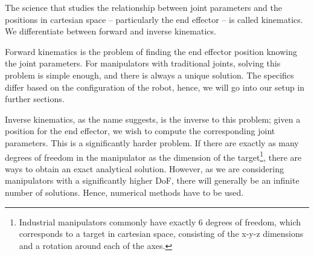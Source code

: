 The science that studies the relationship between joint parameters and the positions in cartesian space -- particularly the end effector -- is called kinematics.
We differentiate between forward and inverse kinematics.

Forward kinematics is the problem of finding the end effector position knowing the joint parameters. For manipulators with traditional joints, solving this problem is simple enough, and there is always a unique solution. The specifics differ based on the configuration of the robot, hence, we will go into our setup in further sections.

Inverse kinematics, as the name suggests, is the inverse to this problem; given a position for the end effector, we wish to compute the corresponding joint parameters. This is a significantly harder problem. If there are exactly as many degrees of freedom in the manipulator as the dimension of the target\footnote{Industrial manipulators commonly have exactly 6 degrees of freedom, which corresponds to a target in cartesian space, consisting of the x-y-z dimensions and a rotation around each of the axes.}, there are ways to obtain an exact analytical solution. However, as we are considering manipulators with a significantly higher DoF, there will generally be an infinite number of solutions. Hence, numerical methods have to be used.
